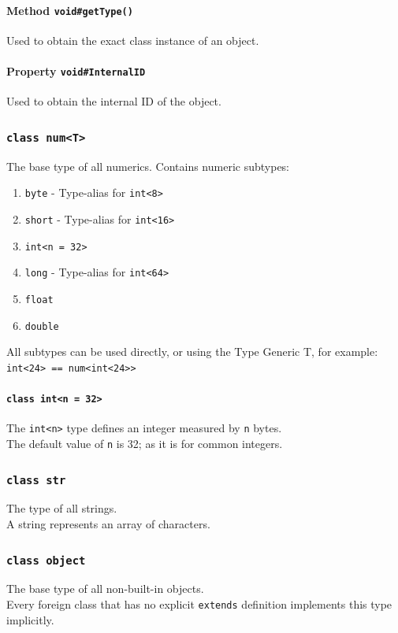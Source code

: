 \documentclass{docs}
\begin{document}
    \paragraph{Method \texttt{void\#getType()}}
    Used to obtain the exact class instance of an object.

    \paragraph{Property \texttt{void\#InternalID}}
    Used to obtain the internal ID of the object.
    
    \label{typeNum}
    \subsubsection{\texttt{class num<T>}}
    The base type of all numerics. Contains numeric subtypes:
    \begin{enumerate}
        \item \texttt{byte} - Type-alias for \texttt{int<8>} %
        \item \texttt{short} - Type-alias for \texttt{int<16>}
        \item \texttt{int<n = 32>}
        \item \texttt{long} - Type-alias for \texttt{int<64>}
        \item \texttt{float}
        \item \texttt{double}
    \end{enumerate}
    All subtypes can be used directly, or using the Type Generic T, for example: \texttt{int<24> == num<int<24>>}
    \label{typeInt}
    \paragraph{\texttt{class int<n = 32>}}
    The \texttt{int<n>} type defines an integer measured by \texttt{n} bytes. \\
    The default value of \texttt{n} is 32; as it is for common integers.
    
    \label{typeStr}
    \subsubsection{\texttt{class str}}
    The type of all strings.
    \\
    A string represents an array of characters.
    
    \label{typeObject}
    \subsubsection{\texttt{class object}}
    The base type of all non-built-in objects.
    \\
    Every foreign class that has no explicit \texttt{extends} definition implements this type implicitly.
    
\end{document}
